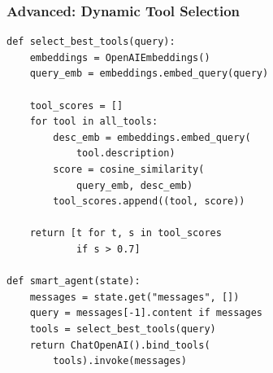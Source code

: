 \documentclass[aspectratio=169,11pt]{beamer}
\begin{document}
\begin{frame}[fragile]
  \frametitle{Advanced: Dynamic Tool Selection}

  \begin{lstlisting}
def select_best_tools(query):
    embeddings = OpenAIEmbeddings()
    query_emb = embeddings.embed_query(query)

    tool_scores = []
    for tool in all_tools:
        desc_emb = embeddings.embed_query(
            tool.description)
        score = cosine_similarity(
            query_emb, desc_emb)
        tool_scores.append((tool, score))

    return [t for t, s in tool_scores
            if s > 0.7]

def smart_agent(state):
    messages = state.get("messages", [])
    query = messages[-1].content if messages
    tools = select_best_tools(query)
    return ChatOpenAI().bind_tools(
        tools).invoke(messages)
  \end{lstlisting}
\end{frame}
\end{document}
